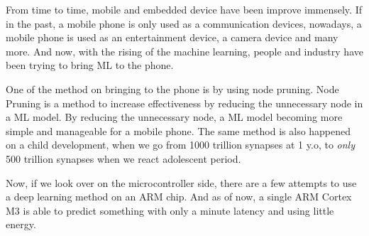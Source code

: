 \documentclass[12pt, a4paper]{article}
\begin{document}
From time to time, mobile and embedded device have been improve immensely. If in the past, a mobile phone is only used as a communication devices, nowadays, a mobile phone is used as an entertainment device, a camera device and many more. And now, with the rising of the machine learning, people and industry have been trying to bring ML to the phone.

One of the method on bringing to the phone is by using node pruning. Node Pruning is a method to increase effectiveness by reducing the unnecessary node in a ML model. By reducing the unnecessary node, a ML model becoming more simple and manageable for a mobile phone. The same method is also happened on a child development, when we go from 1000 trillion synapses at 1 y.o, to \textit{only} 500 trillion synapses when we react adolescent period.

Now, if we look over on the microcontroller side, there are a few attempts to use a deep learning method on an ARM chip. And as of now, a single ARM Cortex M3 is able to predict something with only a minute latency and using little energy.
\end{document}
